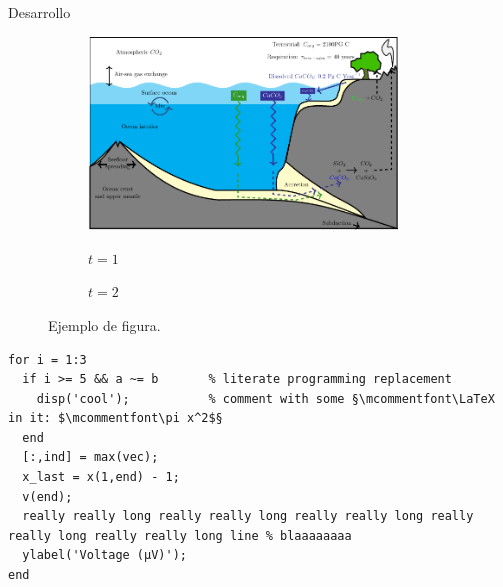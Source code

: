 Desarrollo \cite{wikipedia1}

\begin{figure}[H]
  \centering
  \begin{subfigure}[b]{0.475\textwidth}
    \centering
        {
          \includegraphics[width= 0.9\textwidth]{img/figura.pdf} %
        }
        \caption{$t=1$}     
  \end{subfigure}
  \begin{subfigure}[b]{0.475\textwidth}
    \centering
        {
        }     
        \caption{$t=2$}
  \end{subfigure}
\caption{Ejemplo de figura.}\label{fig: ejem}
\end{figure}

\begin{lstlisting}
for i = 1:3
  if i >= 5 && a ~= b       % literate programming replacement
    disp('cool');           % comment with some §\mcommentfont\LaTeX in it: $\mcommentfont\pi x^2$§
  end
  [:,ind] = max(vec);
  x_last = x(1,end) - 1;
  v(end);
  really really long really really long really really long really really long really really long line % blaaaaaaaa
  ylabel('Voltage (µV)');
end
\end{lstlisting}